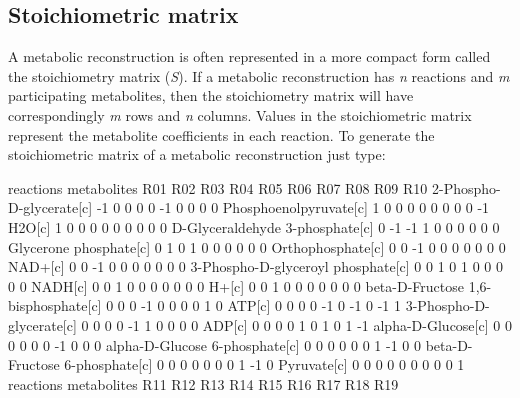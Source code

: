 \subsection{Stoichiometric matrix}
A metabolic reconstruction is often represented in a more compact form called the stoichiometry matrix (\textit{S}). If a metabolic reconstruction has \textit{n} reactions and \textit{m} participating metabolites, then the stoichiometry matrix will have correspondingly \textit{m} rows and \textit{n} columns. Values in the stoichiometric matrix represent the metabolite coefficients in each reaction. To generate the stoichiometric matrix of a metabolic reconstruction just type:
\begin{Schunk}
\begin{Soutput}
                                     reactions
metabolites                           R01 R02 R03 R04 R05 R06 R07 R08 R09 R10
  2-Phospho-D-glycerate[c]             -1   0   0   0   0  -1   0   0   0   0
  Phosphoenolpyruvate[c]                1   0   0   0   0   0   0   0   0  -1
  H2O[c]                                1   0   0   0   0   0   0   0   0   0
  D-Glyceraldehyde 3-phosphate[c]       0  -1  -1   1   0   0   0   0   0   0
  Glycerone phosphate[c]                0   1   0   1   0   0   0   0   0   0
  Orthophosphate[c]                     0   0  -1   0   0   0   0   0   0   0
  NAD+[c]                               0   0  -1   0   0   0   0   0   0   0
  3-Phospho-D-glyceroyl phosphate[c]    0   0   1   0   1   0   0   0   0   0
  NADH[c]                               0   0   1   0   0   0   0   0   0   0
  H+[c]                                 0   0   1   0   0   0   0   0   0   0
  beta-D-Fructose 1,6-bisphosphate[c]   0   0   0  -1   0   0   0   0   1   0
  ATP[c]                                0   0   0   0  -1   0  -1   0  -1   1
  3-Phospho-D-glycerate[c]              0   0   0   0  -1   1   0   0   0   0
  ADP[c]                                0   0   0   0   1   0   1   0   1  -1
  alpha-D-Glucose[c]                    0   0   0   0   0   0  -1   0   0   0
  alpha-D-Glucose 6-phosphate[c]        0   0   0   0   0   0   1  -1   0   0
  beta-D-Fructose 6-phosphate[c]        0   0   0   0   0   0   0   1  -1   0
  Pyruvate[c]                           0   0   0   0   0   0   0   0   0   1
                                     reactions
metabolites                           R11 R12 R13 R14 R15 R16 R17 R18 R19

\end{Soutput}
\end{Schunk}
